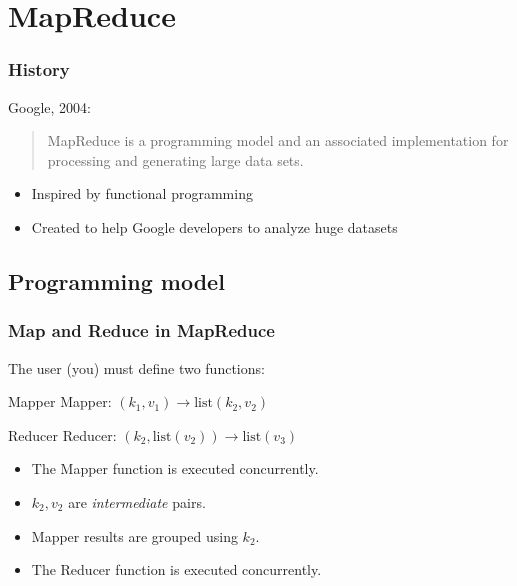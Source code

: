 \section{MapReduce}
\begin{frame}
\frametitle{History}

\begin{block}{Google, 2004:}
\begin{quotation}
MapReduce is a programming model and an associated
implementation for processing and generating large
data sets.
\end{quotation}
\end{block}

\begin{itemize}
\item Inspired by functional programming
\item Created to help Google developers to analyze huge datasets
\end{itemize}

\end{frame}

\subsection{Programming model}
% 
% 
% 

\begin{frame}
\frametitle{Map and Reduce in MapReduce}
The user (you) must define two functions:

\begin{block}{Mapper}
Mapper: $(k_1,v_1) \rightarrow \text{list}(k_2,v_2)$
\end{block}

\begin{block}{Reducer}
Reducer: $(k_2,\text{list}(v_2)) \rightarrow \text{list}(v_3)$
\end{block}

\begin{itemize}
\item The Mapper function is executed concurrently.
\item $k_2, v_2$ are \textit{intermediate} pairs. 
\item Mapper results are grouped using $k_2$.
\item The Reducer function is executed concurrently.
\end{itemize}
\end{frame}

